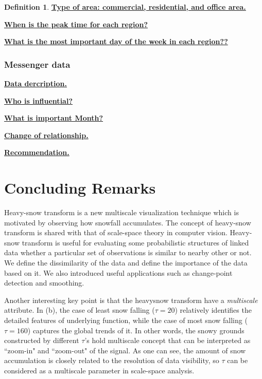 \documentclass[preprint, review, 12pt]{article}
\theoremstyle{definition}
\newtheorem{dfn}{Definition}
\theoremstyle{remark}
\begin{document}
\begin{dfn}
\noindent\textbf{\underline{Type of area: commercial, residential, and office area.}}

\noindent\textbf{\underline{When is the peak time for each region?}}

\noindent\textbf{\underline{What is the most important day of the week in each region??}}

\subsubsection{Messenger data} 

\noindent\textbf{\underline{Data dercription.}}

\noindent\textbf{\underline{Who is influential?}}

\noindent\textbf{\underline{What is important Month?}}

\noindent\textbf{\underline{Change of relationship.}}

\noindent\textbf{\underline{Recommendation.}}



\section{Concluding Remarks}
Heavy-snow transform is a new multiscale visualization technique which is motivated by observing how snowfall accumulates. The concept of heavy-snow transform is shared with that of scale-space theory in computer vision. Heavy-snow transform is useful for evaluating some probabilistic structures of linked data whether a particular set of observations is similar to nearby other or not. We define the dissimilarity of the data and define the importance of the data based on it. We also introduced useful applications such as change-point detection and smoothing.

\iffalse
Another interesting key point is that the heavysnow transform have a \emph{multiscale} attribute. In (b), the case of least snow falling ($\tau=20$) relatively identifies the detailed features of underlying function, while the case of most snow falling ($\tau=160$) captures the global trends of it. In other words, the snowy grounds constructed by different $\tau$'s hold multiscale concept that can be interpreted as ``zoom-in" and ``zoom-out" of the signal. As one can see, the amount of snow accumulation is closely related to the resolution of data visibility, so $\tau$ can be considered as a multiscale parameter in scale-space analysis.


\end{dfn}
\end{document}
